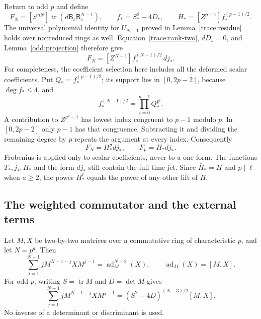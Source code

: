 Return to odd $p$ and define
\[
 F_N=[z^{mN}]\operatorname{tr}
       (d\mathsf B_s\mathsf B_s^{N-1}),\qquad
 f_*=S_*^2-4D_*,\qquad
 H_*=[Z^{p-1}]f_*^{(p-1)/2}.
\]
The universal polynomial identity for $U_{N-1}$ proved in
Lemma~\ref{trace:residue} holds over nonreduced rings as well.
Equation~\eqref{trace:rank-two}, $dD_s=0$, and
Lemma~\ref{odd:projection} therefore give
\begin{equation}
 F_N=[Z^{N-1}]f_*^{(N-1)/2}\,dj_*.
 \label{odd:internal-coefficient}
\end{equation}
For completeness, the coefficient selection here includes all the
deformed scalar coefficients. Put $Q_*=f_*^{(p-1)/2}$; its support
lies in $[0,2p-2]$, because $\deg f_*\le4$, and
\[
 f_*^{(N-1)/2}=\prod_{i=0}^{a-1}Q_*^{p^i}.
\]
A contribution to $Z^{p^a-1}$ has lowest index congruent to $p-1$
modulo $p$. In $[0,2p-2]$ only $p-1$ has that congruence.
Subtracting it and dividing the remaining degree by $p$ repeats
the argument at every index. Consequently
\begin{equation}
 F_N=H_*^\sigma dj_*,\qquad F_p=H_*dj_*.
 \label{odd:internal-factorisation}
\end{equation}
Frobenius is applied only to scalar coefficients, never to a one-form.
The functions $T_*,j_*,H_*$ and the form $dj_*$ still contain the
full time jet. Since $\bar H_*=H$ and $p\mid\ell$ when $a\ge2$,
the power $H_*^\ell$ equals the power of any other lift of $H$.

\subsection{The weighted commutator and the external terms}

\begin{lemma}
\label{odd:commutator}
Let $M,X$ be two-by-two matrices over a commutative ring of
characteristic $p$, and let $N=p^a$. Then
\begin{equation}
 \sum_{j=1}^{N-1}jM^{N-1-j}XM^{j-1}
 =\operatorname{ad}_M^{N-2}(X),
 \qquad \operatorname{ad}_M(X)=[M,X].
 \label{odd:weighted-operator}
\end{equation}
For odd $p$, writing $S=\operatorname{tr}M$ and $D=\det M$ gives
\begin{equation}
 \sum_{j=1}^{N-1}jM^{N-1-j}XM^{j-1}
 =(S^2-4D)^{(N-3)/2}[M,X].
 \label{odd:weighted-commutator}
\end{equation}
No inverse of a determinant or discriminant is used.
\end{lemma}

